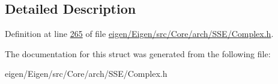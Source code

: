 \subsection{Detailed Description}


Definition at line \hyperlink{eigen_2_eigen_2src_2_core_2arch_2_s_s_e_2_complex_8h_source_l00265}{265} of file \hyperlink{eigen_2_eigen_2src_2_core_2arch_2_s_s_e_2_complex_8h_source}{eigen/\+Eigen/src/\+Core/arch/\+S\+S\+E/\+Complex.\+h}.



The documentation for this struct was generated from the following file\+:\begin{DoxyCompactItemize}
\item 
eigen/\+Eigen/src/\+Core/arch/\+S\+S\+E/\+Complex.\+h\end{DoxyCompactItemize}

